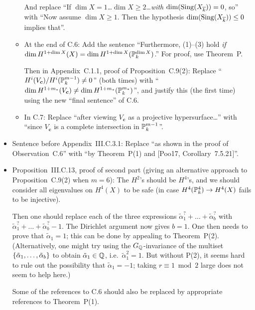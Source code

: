 \documentclass[12pt]{article}
\begin{document}
\begin{itemize}
\begin{itemize}
        And replace ``If $\dim{X}=1$\dots $\dim{X}\geq2$\dots \emph{with $\dim(\operatorname{Sing}(X_{\overline{k}}))=0$}, so''
        with ``Now assume $\dim{X}\geq 1$. Then the hypothesis $\dim(\operatorname{Sing}(X_{\overline{k}}))\leq 0$ implies that''.
        
        \item At the end of C.6:
        Add the sentence ``Furthermore, (1)--(3) hold \emph{if} $\dim H^{1+\dim{X}}(X) = \dim H^{1+\dim{X}}(\mathbb{P}^{\dim{X}}_k)$.''
        For proof, use Theorem~P.
        
        Then in Appendix~C.1.1, proof of Proposition~C.9(2):
        Replace ``$H^i(V_{\bm{c}})/H^i(\mathbb{P}^{m-1}_k)\neq0$'' (both times)
        with ``$\dim H^{1+m_\ast}(V_{\bm{c}})\neq \dim H^{1+m_\ast}(\mathbb{P}^{m_\ast}_k)$'',
        and justify this (the first time) using the new ``final sentence'' of C.6.
        
        \item In C.7:
        Replace ``after viewing $V_{\bm{c}}$ as a projective hypersurface\dots'' with ``since $V_{\bm{c}}$ is a complete intersection in $\mathbb{P}^{m-1}_k$''.
    \end{itemize}
    
    \item Sentence before Appendix~III.C.3.1:
    Replace ``as shown in the proof of Observation~C.6''
    with ``by Theorem~P(1) and [Poo17, Corollary~7.5.21]''.
    
    \item Proposition~III.C.13, proof of second part (giving an alternative approach to Proposition~C.9(2) when $m=6$):
    The $H^2$'s should be $H^4$'s,
    and we should consider all eigenvalues on $H^4(X)$ to be safe (in case $H^4(\mathbb{P}^4_k)\to H^4(X)$ fails to be injective).
    
    Then one should replace each of the three expressions $\tilde{\alpha}_1^?+\dots+\tilde{\alpha}_b^?$ with $\tilde{\alpha}_1^?+\dots+\tilde{\alpha}_b^?-1$.
    The Dirichlet argument now gives $b=1$.
    One then needs to prove that $\tilde{\alpha}_1 = 1$;
    this can be done by appealing to Theorem~P(2).
    (Alternatively, one might try using the $G_{\mathbb{Q}}$-invariance of the multiset $\{\tilde{\alpha}_1,\dots,\tilde{\alpha}_b\}$ to obtain $\tilde{\alpha}_1\in \mathbb{Q}$, i.e.~$\tilde{\alpha}_1^2 = 1$.
    But without P(2), it seems hard to rule out the possibility that $\tilde{\alpha}_1 = -1$;
    taking $r\equiv 1\bmod{2}$ large does not seem to help here.)
    
    Some of the references to C.6 should also be replaced by appropriate references to Theorem~P(1).
\end{itemize}
\end{document}
